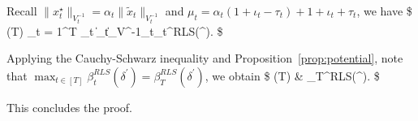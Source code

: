 Recall $\|x^{\star}_t\|_{V^{-1}_t} = \alpha_t \|\tilde{x}_t\|_{V^{-1}_t}$ and $\mu_t  =  \alpha_t(1+\iota_t -\tau_t)+1+\iota_t+\tau_t$, we have 
\$
\cR(T)  \leq \sum_{t = 1}^T   \mu_t \|_t\|_{V^{-1}_t}\beta_t^{RLS}(\delta^\prime).
\$ 

Applying the Cauchy-Schwarz inequality and Proposition~\ref{prop:potential}, note that $\max_{t\in[T]}  \beta_t^{RLS}(\delta^\prime) = \beta_T^{RLS}(\delta^\prime)$, we obtain 
\$
\cR(T) &\leq   {}  \leq {}    \beta_T^{RLS}(\delta^\prime).
\$


This concludes the proof.\Halmos
\endproof

%
%
%
%
%
%
